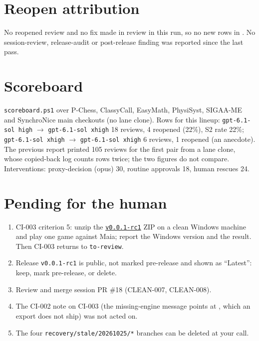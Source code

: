 \documentclass[11pt,a4paper]{article}
\begin{document}
\section*{Reopen attribution}

No reopened review and no fix made in review in this run, so no new rows in
. No session-review, release-audit or post-release finding was
reported since the last pass.

\section*{Scoreboard}

\texttt{scoreboard.ps1} over P-Chess, ClassyCall, EasyMath, PhysiSyst, SIGAA-ME and
SynchroNice main checkouts (no lane clone). Rows for this lineup: \texttt{gpt-6.1-sol high}
$\rightarrow$ \texttt{gpt-6.1-sol xhigh} 18 reviews, 4 reopened (22\%), S2 rate 22\%;
\texttt{gpt-6.1-sol xhigh} $\rightarrow$ \texttt{gpt-6.1-sol xhigh} 6 reviews, 1 reopened (an
anecdote). The previous report printed 105 reviews for the first pair from a lane clone, whose
copied-back log counts rows twice; the two figures do not compare. Interventions:
proxy-decision (opus) 30, routine approvals 18, human rescues 24.

\section*{Pending for the human}

\begin{enumerate}
  \item CI-003 criterion 5: unzip the
        \href{https://github.com/Laginho/P-Chess/releases/tag/v0.0.1-rc1}{\texttt{v0.0.1-rc1}}
        ZIP on a clean Windows machine and play one game against Maia; report the Windows
        version and the result. Then CI-003 returns to \texttt{to-review}.
  \item Release \texttt{v0.0.1-rc1} is public, not marked pre-release and shown as ``Latest'':
        keep, mark pre-release, or delete.
  \item Review and merge session PR \#18 (CLEAN-007, CLEAN-008).
  \item The CI-002 note on CI-003 (the missing-engine message points at
        , which an export does not ship) was not acted on.
  \item The four \texttt{recovery/stale/20261025/*} branches can be deleted at your call.
\end{enumerate}
\end{document}
